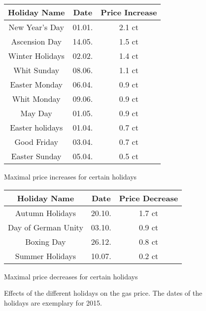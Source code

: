 \begin{figure}
\begin{subtable}{0.5\textwidth}
\centering
\begin{tabular}{c|c|c}

Holiday Name    & Date   & Price Increase            \\ \hline
New Year's Day  & 01.01. & 2.1 ct                       \\ \hline
Ascension Day   & 14.05. & 1.5 ct                      \\ \hline
Winter Holidays & 02.02. & 1.4 ct                      \\ \hline
Whit Sunday     & 08.06. & 1.1 ct                      \\ \hline
Easter Monday   & 06.04. & 0.9 ct                      \\ \hline
Whit Monday     & 09.06. & 0.9 ct                      \\ \hline
May Day         & 01.05. & 0.9 ct                      \\ \hline
Easter holidays & 01.04. & 0.7 ct                      \\ \hline
Good Friday     & 03.04. & 0.7 ct                      \\ \hline
Easter Sunday   & 05.04. & 0.5 ct                      \\
\end{tabular}
\caption{Maximal price increases for certain holidays}
\label{maximal-price-increases}
\end{subtable}
\begin{subtable}{0.5\textwidth}
\centering
\begin{tabular}{c|c|c}
Holiday Name    & Date   & Price Decrease                   \\ \hline
Autumn Holidays     & 20.10.       & 1.7 ct                      \\ \hline
Day of German Unity & 03.10.       & 0.9 ct                      \\ \hline
Boxing Day          & 26.12.       & 0.8 ct                      \\ \hline
Summer Holidays     & 10.07.       & 0.2 ct                      \\
\end{tabular}
\caption{Maximal price decreases for certain holidays}
\label{maximal-price-decreases}
\end{subtable}
\caption{Effects of the different holidays on the gas price. The dates of the holidays are exemplary for 2015.}
\end{figure}
